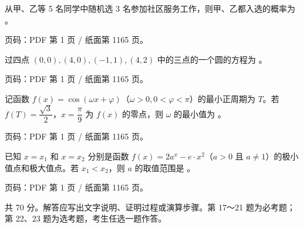 \begin{question}
从甲、乙等 5 名同学中随机选 3 名参加社区服务工作，则甲、乙都入选的概率为 \gkblank{}。

\begin{gktip}
页码：PDF 第 1 页 / 纸面第 1165 页。
\end{gktip}

\end{question}
\begin{question}
过四点 $(0,0),(4,0),(-1,1),(4,2)$ 中的三点的一个圆的方程为 \gkblank{}。

\begin{gktip}
页码：PDF 第 1 页 / 纸面第 1165 页。
\end{gktip}

\end{question}
\begin{question}
记函数 $f(x)=\cos(\omega x+\varphi)$（$\omega>0,0<\varphi<\pi$）的最小正周期为 $T$。若 $f(T)=\dfrac{\sqrt3}{2}$，$x=\dfrac\pi9$ 为 $f(x)$ 的零点，则 $\omega$ 的最小值为 \gkblank{}。

\begin{gktip}
页码：PDF 第 1 页 / 纸面第 1165 页。
\end{gktip}

\end{question}
\begin{question}
已知 $x=x_1$ 和 $x=x_2$ 分别是函数 $f(x)=2a^x-e\cdot x^2$（$a>0$ 且 $a\ne1$）的极小值点和极大值点。若 $x_1<x_2$，则 $a$ 的取值范围是 \gkblank{}。

\begin{gktip}
页码：PDF 第 1 页 / 纸面第 1165 页。
\end{gktip}

\end{question}

\begin{gktip}
共 70 分。解答应写出文字说明、证明过程或演算步骤。第 17～21 题为必考题；第 22、23 题为选考题，考生任选一题作答。
\end{gktip}

